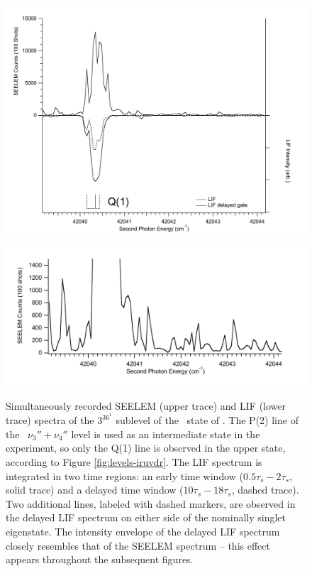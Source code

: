 \documentclass[12pt]{mitthesis}
\begin{document}
\begin{figure}
  \caption{Simultaneously recorded SEELEM (upper trace) and LIF (lower
    trace) spectra of the $3^36^1$  sublevel of the \astate\
    state of .  The P(2) line of the \xstate\ $\nu_3'' +
    \nu_4''$ level is used as an intermediate state in the experiment,
    so only the Q(1) line is observed in the upper state, according to
    Figure \ref{fig:levels-iruvdr}.  The LIF spectrum is integrated in
    two time regions: an early time window ($0.5\tau_s-2\tau_s$, solid
    trace) and a delayed time window ($10\tau_s-18\tau_s$, dashed
    trace).  Two additional lines, labeled with dashed markers, are
    observed in the delayed LIF spectrum on either side of the
    nominally singlet eigenstate. The intensity envelope of the
    delayed LIF spectrum closely resembles that of the SEELEM spectrum
    -- this effect appears throughout the subsequent figures.}
  \label{fig:3361-q1}
  \centering
  \includegraphics[width=6in]{spectrum-3361-q1-split.pdf}
  \includegraphics[width=5.5in]{spectrum-3361-q1-zoom.pdf}
\end{figure}
\end{document}
